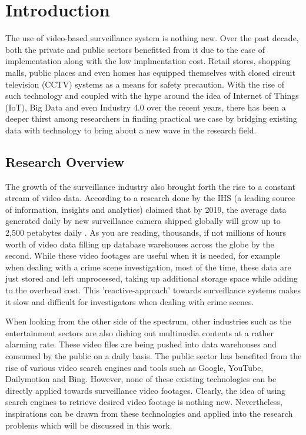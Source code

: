 \chapter{Introduction}
The use of video-based surveillance system is nothing new. Over the past decade, both the private and public sectors benefitted from it due to the ease of implementation along with the low implmentation cost.
Retail stores, shopping malls, public places and even homes has equipped themselves with closed circuit television (CCTV) systems as a means for safety precaution.
With the rise of such technology and coupled with the hype around the idea of Internet of Things (IoT), Big Data and even Industry 4.0 over the recent years, there has been a deeper thirst among researchers in finding practical use case by bridging existing data with technology to bring about a new wave in the research field.

\section{Research Overview}
\label{section:introduction}

The growth of the surveillance industry also brought forth the rise to a constant stream of video data. According to a research done by the IHS (a leading source of information, insights and analytics) claimed that by 2019, the average data generated daily by new surveillance camera shipped globally will grow up to 2,500 petabytes daily \cite{}.
As you are reading, thousands, if not millions of hours worth of video data filling up database warehouses across the globe by the second. While these video footages are useful when it is needed, for example when dealing with a crime scene investigation, most of the time, these data are just stored and left unprocessed, taking up additional storage space while adding to the overhead cost.
This 'reactive-approach' towards surveillance systems makes it slow and difficult for investigators when dealing with crime scenes.

When looking from the other side of the spectrum, other industries such as the entertainment sectors are also dishing out multimedia contents at a rather alarming rate. These video files are being pushed into data warehouses and consumed by the public on a daily basis. The public sector has benefited from the rise of various video search engines and tools such as Google, YouTube, Dailymotion and Bing. However, none of these existing technologies can be directly applied towards surveillance video footages. Clearly, the idea of using search engines to retrieve desired video footage is nothing new. Nevertheless, inspirations can be drawn from these technologies and applied into the research problems which will be discussed in this work.

